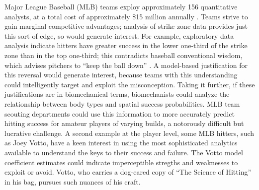 Major League Baseball (MLB\textsuperscript{\textregistered}) teams exploy approximately 156 quantitative analysts, at a total cost of approximately \$15 million annually \citep{Lindbergh2016}. Teams strive to gain marginal competitive advantages; analysis of strike zone data provides just this sort of edge, so would generate interest. For example, exploratory data analysis indicate hitters have greater success in the lower one-third of the strike zone than in the top one-third; this contradicts baseball conventional wisdom, which advises pitchers to ``keep the ball down'' \citep{Stallings2003}. A model-based justification for this reversal would generate interest, because teams with this understanding could intelligently target and exploit the misconception. Taking it further, if these justifications are in biomechanical terms, biomechanists could analyze the relationship between body types and spatial success probabilities. MLB\textsuperscript{\textregistered} team scouting departments could use this information to more accurately predict hitting success for amateur players of varying builds, a notorously difficult but lucrative challenge. A second example at the player level, some MLB\textsuperscript{\textregistered} hitters, such as Joey Votto, have a keen interest in using the most sophisticated analytics available to understand the keys to their success and failure\citep{Daugherty2015}. The Votto model coefficient estimates could indicate imperceptible stregths and weaknesses to exploit or avoid. Votto, who carries a dog-eared copy of ``The Science of Hitting'' in his bag, pursues such nuances of his craft. 

